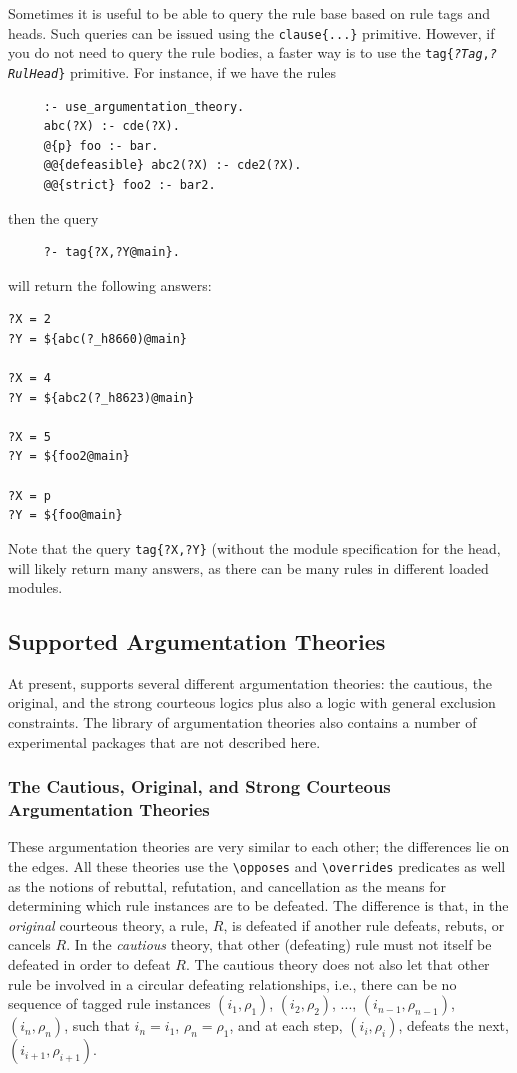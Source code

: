 \documentclass[11pt]{article}
\newcommand{\ERGO}{\mbox{\smaller{\ensuremath{\cal{E}}\smaller{{\sc{RGO}}}}}\xspace}
\newcommand{\FLSYSTEM}{\ERGO}
\newcommand{\bs}{\textbackslash}
\begin{document}
Sometimes it is useful to be able to query the rule base based on rule
tags and heads. Such queries can be issued
using the {\tt clause\{...\}} primitive. However, 
if you do not need to query the rule bodies, a faster way is to use the
{\tt tag\{{\it?Tag},{\it ?RulHead}\}}  primitive. For instance, if we have
the rules
\begin{verbatim}
     :- use_argumentation_theory.
     abc(?X) :- cde(?X).
     @{p} foo :- bar.
     @@{defeasible} abc2(?X) :- cde2(?X).
     @@{strict} foo2 :- bar2.
\end{verbatim}
then the query
\begin{verbatim}
     ?- tag{?X,?Y@main}.
\end{verbatim}
will return the following answers:
\begin{verbatim}
?X = 2
?Y = ${abc(?_h8660)@main}

?X = 4
?Y = ${abc2(?_h8623)@main}

?X = 5
?Y = ${foo2@main}

?X = p
?Y = ${foo@main}
\end{verbatim}
Note that the query \texttt{tag\{?X,?Y\}} (without the module specification
for the head, will likely return many answers, as there can be many rules
in different loaded modules. 


\subsection{Supported Argumentation Theories}\label{sec-exclusion-constr}

At present, \FLSYSTEM supports several different argumentation theories: the
cautious,
the original, and the strong courteous logics plus also a
logic with general exclusion constraints. The \FLSYSTEM library of
argumentation theories also contains a number of
experimental packages that are not described here.

\subsubsection{The Cautious, Original, and Strong Courteous Argumentation Theories}

These argumentation theories are very similar to each other; the
differences lie on the edges. All these theories use the {\tt \bs{}opposes} and
{\tt \bs{}overrides} predicates as well as the notions of rebuttal,
refutation, and cancellation as the means for determining which rule
instances are to be defeated. The difference is that, in the \emph{original} courteous
theory, a rule, $R$, is defeated if another rule defeats, rebuts, or
cancels $R$.
In the \emph{cautious} theory, that other (defeating)
rule must not itself be defeated in order to
defeat $R$. The cautious theory does not also let that other rule be
involved in a circular defeating relationships,
i.e., there can be no sequence of
  tagged rule instances $(i_1,\rho_1)$, $(i_2,\rho_2)$, ...,
  $(i_{n-1},\rho_{n-1})$, $(i_n,\rho_n)$, such that $i_n=i_1$,
  $\rho_n=\rho_1$, and at each step, $(i_i,\rho_i)$, defeats the next,
  $(i_{i+1},\rho_{i+1})$.
\end{document}
